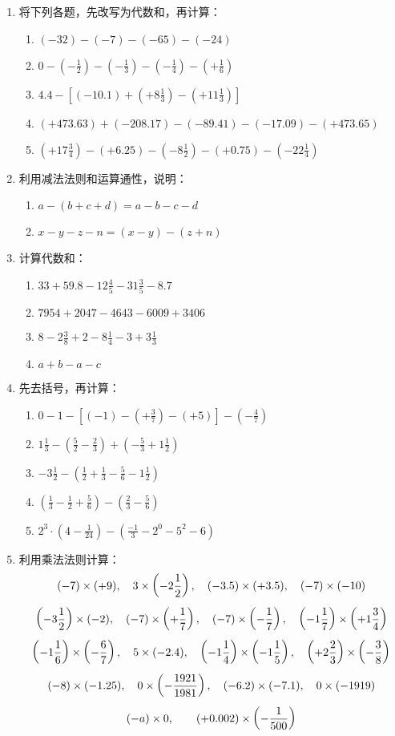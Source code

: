 \begin{enumerate}
\item 将下列各题，先改写为代数和，再计算：
\begin{enumerate}
    \item $(-32)-(-7)-(-65)-(-24)$
    \item $0-\left(-\frac{1}{2}\right)-\left(-\frac{1}{3}\right)-\left(-\frac{1}{4}\right)-\left(+\frac{1}{6}\right)$
    \item $4.4-\left[(-10.1)+\left(+8\frac{1}{3}\right)-\left(+11\frac{1}{3}\right)\right]$
    \item $(+473.63)+(-208.17)-(-89.41)-(-17.09)-(+473.65)$
    \item $\left(+17\frac{3}{4}\right)-(+6.25)-\left(-8\frac{1}{2}\right)-(+0.75)-\left(-22\frac{1}{4}\right)$
\end{enumerate}
\item 利用减法法则和运算通性，说明：
\begin{enumerate}
    \item $a-(b+c+d)=a-b-c-d$
    \item $x-y-z-n=(x-y)-(z+n)$
\end{enumerate}
\item 计算代数和：
\begin{enumerate}
    \item $33+59.8-12 \frac{4}{5}-31 \frac{3}{5}-8.7$
    \item $7954+2047-4643-6009+3406$
    \item $8-2 \frac{3}{8}+2-8 \frac{1}{4}-3+3 \frac{1}{3}$
    \item $a+b-a-c$
\end{enumerate}

\item 
先去括号，再计算：
\begin{enumerate}
\item $0-1-\left[(-1)-\left(+\frac{3}{7}\right)-(+5)\right]-\left(-\frac{4}{7}\right) $
\item $1 \frac{1}{3}-\left(\frac{5}{2}-\frac{2}{3}\right)+\left(-\frac{5}{3}+1 \frac{1}{2}\right)$
\item  $-3 \frac{1}{2}-\left(\frac{1}{2}+\frac{1}{3}- \frac{5}{6}-1 \frac{1}{2}\right)$
\item $\left(\frac{1}{3}-\frac{1}{2}+\frac{5}{6}\right)-\left(\frac{2}{3}-\frac{5}{6}\right)$
\item $2^{3} \cdot\left(4-\frac{1}{24}\right)-\left(\frac{-1}{3}-2^{0}-5^{2}-6\right)$
\end{enumerate}

\item 利用乘法法则计算：
\[(-7)\times (+9),\quad 3\times\left(-2\dfrac{1}{2}\right),\quad (-3.5)\times (+3.5),\quad (-7)\times(-10) \]
\[ \left(-3\dfrac{1}{2}\right)\times (-2),\quad (-7)\times\left(+\dfrac{1}{7}\right),\quad (-7)\times\left(-\dfrac{1}{7}\right) ,\quad \left(-1\dfrac{1}{7}\right)\times\left(+1\dfrac{3}{4}\right) \]
\[\left(-1\dfrac{1}{6}\right)\times\left(-\dfrac{6}{7}\right),\quad 5\times (-2.4),\quad \left(-1\dfrac{1}{4}\right)\times\left(-1\dfrac{1}{5}\right),\quad \left(+2\dfrac{2}{3}\right)\times\left(-\dfrac{3}{8}\right) \]
\[(-8)\times (-1.25),\quad 0\times\left(-\dfrac{1921}{1981}\right),\quad (-6.2)\times (-7.1),\quad 0\times (-1919)\]
\[(-a)\times 0,\qquad (+0.002)\times \left(-\dfrac{1}{500}\right)\]


\end{enumerate}
